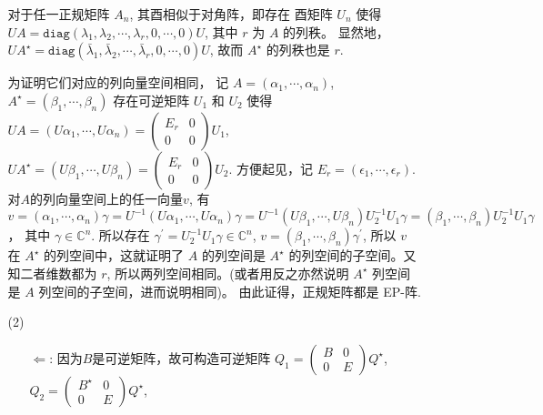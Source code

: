 \documentclass{article}
\begin{document}
\begin{spacing}{1.5}
\begin{enumerate}
\begin{itemize}
                        对于任一正规矩阵 $A_n$, 其酉相似于对角阵，即存在 酉矩阵 $U_n$ 使得 $UA = \mathtt{diag}(\lambda_1, \lambda_2,\cdots, \lambda_r, 0, \cdots, 0)U$, 其中 $r$ 为 $A$ 的列秩。
                        显然地，$UA^\star = \mathtt{diag}(\bar\lambda_1,\bar\lambda_2, \cdots, \bar\lambda_r, 0, \cdots, 0)U$, 故而 $A^\star$ 的列秩也是 $r$. 
                        
                        为证明它们对应的列向量空间相同，
                        记 $A = (\alpha_1, \cdots, \alpha_n)$, $A^\star = (\beta_1, \cdots, \beta_n)$ 存在可逆矩阵 $U_1$ 和 $U_2$ 使得 $UA = (U\alpha_1,\cdots,U\alpha_n) = \left(\begin{array}{cc}E_r&0\\0&0\end{array}\right)U_1$, 
                        $UA^\star = (U\beta_1,\cdots, U\beta_n) = \left(\begin{array}{cc}E_r&0\\0&0\end{array}\right)U_2$. 方便起见，记 $E_r = (\epsilon_1, \cdots, \epsilon_r)$. 
                        对$A$的列向量空间上的任一向量$v$, 有 
                        $$v = (\alpha_1, \cdots, \alpha_n) \gamma = U^{-1}(U\alpha_1, \cdots, U\alpha_n)\gamma = U^{-1} (U\beta_1, \cdots, U\beta_n)U_2^{-1}U_1\gamma = (\beta_1, \cdots, \beta_n)U_2^{-1}U_1\gamma$$， 其中 $\gamma \in\mathbb{C}^n$.
                        所以存在 $\gamma^\prime = U_2^{-1}U_1\gamma\in\mathbb{C}^n$, $v = (\beta_1, \cdots, \beta_n) \gamma^\prime$, 所以 $v$ 在 $A^\star$ 的列空间中，这就证明了 $A$ 的列空间是 $A^\star$ 的列空间的子空间。又知二者维数都为 $r$, 所以两列空间相同。(或者用反之亦然说明 $A^\star$ 列空间是 $A$ 列空间的子空间，进而说明相同)。
                        由此证得，正规矩阵都是 EP-阵.

            \item [(2)] 
            \begin{enumerate}
                \item [$\Leftarrow$:] 因为$B$是可逆矩阵，故可构造可逆矩阵 $Q_1 = \left(\begin{array}{cc}B&0\\0&E\end{array}\right)Q^\star$, $Q_2=\left(\begin{array}{cc}B^\star&0\\0&E\end{array}\right)Q^\star$, 
                

\end{enumerate}
\end{itemize}
\end{enumerate}
\end{spacing}
\end{document}

